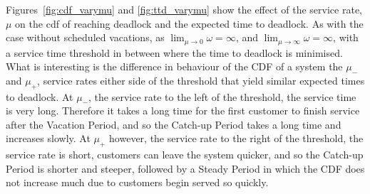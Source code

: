 \documentclass{article}
\begin{document}
Figures~\ref{fig:cdf_varymu} and \ref{fig:ttd_varymu} show the effect of the service rate, $\mu$ on the cdf of reaching deadlock and the expected time to deadlock. As with the case without scheduled vacations, as $\lim_{\mu \to 0} \omega = \infty$, and $\lim_{\mu \to \infty} \omega = \infty$, with a service time threshold in between where the time to deadlock is minimised. What is interesting is the difference in behaviour of the CDF of a system the $\mu_-$ and $\mu_+$, service rates either side of the threshold that yield similar expected times to deadlock. At $\mu_-$, the service rate to the left of the threshold, the service time is very long. Therefore it takes a long time for the first customer to finish service after the Vacation Period, and so the Catch-up Period takes a long time and increases slowly. At $\mu_+$ however, the service rate to the right of the threshold, the service rate is short, customers can leave the system quicker, and so the Catch-up Period is shorter and steeper, followed by a Steady Period in which the CDF does not increase much due to customers begin served so quickly.
\end{document}
